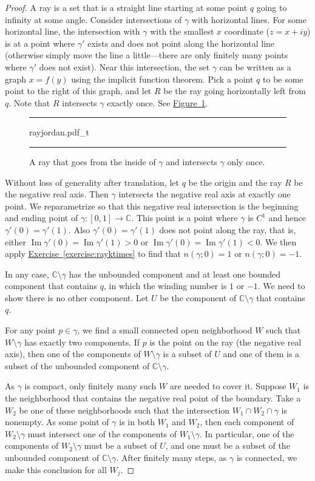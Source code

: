 \documentclass[12pt,openany]{book}
\renewcommand{\Im}{\operatorname{Im}}
\newcommand{\C}{{\mathbb{C}}}
\theoremstyle{plain}
\theoremstyle{remark}
\theoremstyle{definition}
\newenvironment{myfig}{%
\begin{figure}[h!t]
\noindent\rule{\textwidth}{0.5pt}\vspace{12pt}\par\centering}%
{\par\noindent\rule{\textwidth}{0.5pt}
\end{figure}}
\theoremstyle{exercise}
\theoremstyle{example}
\newcommand{\figureref}[1]{\hyperref[#1]{Figure~\ref*{#1}}}
\newcommand{\exerciseref}[1]{\hyperref[#1]{Exercise~\ref*{#1}}}
\begin{document}
\begin{proof}
A ray is a set that is a straight line starting at some point $q$
going to infinity at some angle.
Consider
intersections of $\gamma$ with horizontal lines.  For some horizontal line,
the intersection with $\gamma$ with the smallest $x$ coordinate ($z=x+iy$)
is at a point where $\gamma'$ exists and does not point along
the horizontal line (otherwise
simply move the line a little---there are only finitely many points where
$\gamma'$ does not exist).  Near this intersection, the set $\gamma$
can be written as a graph $x=f(y)$ using the implicit function theorem.
Pick a point $q$ to be some point to the right of this graph, and let $R$ be the
ray going horizontally left from $q$.  Note that $R$ intersects $\gamma$ exactly
once.
See \figureref{fig:rayjordan}.
\begin{myfig}
{rayjordan.pdf_t}
\caption{A ray that goes from the inside of $\gamma$ and intersects $\gamma$
only once.\label{fig:rayjordan}}
\end{myfig}

Without loss of generality after translation, let $q$ be the origin and
the ray $R$ be the negative real axis.  Then $\gamma$ intersects the negative
real axis at exactly one point.
We reparametrize so that this negative real intersection
is the beginning and ending point of $\gamma \colon [0,1] \to \C$.  This
point is a point where $\gamma$ is $C^1$ and hence $\gamma'(0) =
\gamma'(1)$.  Also $\gamma'(0) = \gamma'(1)$ does not point along the ray,
that is, either
$\Im \gamma'(0) = \Im \gamma'(1) > 0$ or
$\Im \gamma'(0) = \Im \gamma'(1) < 0$.
We then apply
\exerciseref{exercise:rayktimes} to find that $n(\gamma;0) = 1$ or
$n(\gamma;0) = -1$.

In any case, $\C \setminus \gamma$ has the unbounded component
and at least one bounded component that contains $q$,
in which the winding number is $1$ or $-1$.  We
need to show there is no other component.  Let $U$ be the component of $\C
\setminus \gamma$ that contains $q$.

For any point $p \in \gamma$, we find a small connected open neighborhood
$W$ such that $W \setminus \gamma$ has exactly two components.
If $p$ is the point on the ray (the negative real axis), then one of the
components of $W \setminus \gamma$ is a subset of $U$ and one of them is a
subset of the unbounded component of $\C \setminus \gamma$.

As $\gamma$ is compact, only finitely many such $W$ are needed
to cover it.
Suppose $W_1$ is the neighborhood that contains the negative real point of
the boundary.  Take a $W_2$ be one of these neighborhoods such that the
intersection $W_1 \cap W_2 \cap \gamma$ is nonempty.  As some point of $\gamma$ is
in both $W_1$ and $W_2$, then each component of $W_2 \setminus \gamma$
must intersect one of the components of $W_1 \setminus \gamma$.  In
particular,
one of the components of $W_2 \setminus \gamma$ must be a subset of $U$,
and one must be a subset of the unbounded component of $\C \setminus
\gamma$.  After finitely many steps, as $\gamma$ is connected, we make this
conclusion for all $W_j$.


\end{proof}
\end{document}
